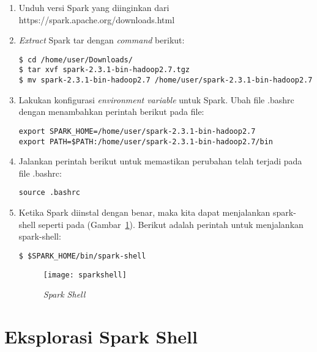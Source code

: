 \begin{enumerate}

\item Unduh versi Spark yang diinginkan  dari https://spark.apache.org/downloads.html

\item \textit{Extract} Spark tar dengan \textit{command} berikut:

\begin{verbatim}
$ cd /home/user/Downloads/ 
$ tar xvf spark-2.3.1-bin-hadoop2.7.tgz 
$ mv spark-2.3.1-bin-hadoop2.7 /home/user/spark-2.3.1-bin-hadoop2.7 
\end{verbatim}

\item Lakukan konfigurasi \textit{environment variable} untuk Spark. Ubah file .bashrc dengan menambahkan perintah berikut pada file:

\begin{verbatim}
export SPARK_HOME=/home/user/spark-2.3.1-bin-hadoop2.7
export PATH=$PATH:/home/user/spark-2.3.1-bin-hadoop2.7/bin
\end{verbatim}

\item Jalankan perintah berikut untuk memastikan perubahan telah terjadi pada file .bashrc:

\begin{verbatim}
source .bashrc
\end{verbatim}

\item Ketika Spark diinstal dengan benar, maka kita dapat menjalankan spark-shell seperti pada (Gambar~\ref{fig:sparkshell}). Berikut adalah perintah untuk menjalankan spark-shell:

\begin{verbatim}
$ $SPARK_HOME/bin/spark-shell
\end{verbatim}

\begin{figure}[H]
    \centering  
    \texttt{[image: sparkshell]}  
    \caption[{\it Spark Shell} ]{{\it Spark Shell}} 
    \label{fig:sparkshell} 
\end{figure}

\end{enumerate}


\section{Eksplorasi Spark Shell}

